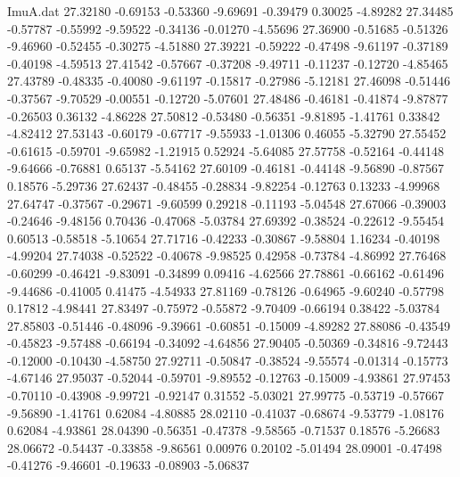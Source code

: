 \begin{filecontents}{ImuA.dat}
  27.32180   -0.69153   -0.53360   -9.69691   -0.39479    0.30025   -4.89282
  27.34485   -0.57787   -0.55992   -9.59522   -0.34136   -0.01270   -4.55696
  27.36900   -0.51685   -0.51326   -9.46960   -0.52455   -0.30275   -4.51880
  27.39221   -0.59222   -0.47498   -9.61197   -0.37189   -0.40198   -4.59513
  27.41542   -0.57667   -0.37208   -9.49711   -0.11237   -0.12720   -4.85465
  27.43789   -0.48335   -0.40080   -9.61197   -0.15817   -0.27986   -5.12181
  27.46098   -0.51446   -0.37567   -9.70529   -0.00551   -0.12720   -5.07601
  27.48486   -0.46181   -0.41874   -9.87877   -0.26503    0.36132   -4.86228
  27.50812   -0.53480   -0.56351   -9.81895   -1.41761    0.33842   -4.82412
  27.53143   -0.60179   -0.67717   -9.55933   -1.01306    0.46055   -5.32790
  27.55452   -0.61615   -0.59701   -9.65982   -1.21915    0.52924   -5.64085
  27.57758   -0.52164   -0.44148   -9.64666   -0.76881    0.65137   -5.54162
  27.60109   -0.46181   -0.44148   -9.56890   -0.87567    0.18576   -5.29736
  27.62437   -0.48455   -0.28834   -9.82254   -0.12763    0.13233   -4.99968
  27.64747   -0.37567   -0.29671   -9.60599    0.29218   -0.11193   -5.04548
  27.67066   -0.39003   -0.24646   -9.48156    0.70436   -0.47068   -5.03784
  27.69392   -0.38524   -0.22612   -9.55454    0.60513   -0.58518   -5.10654
  27.71716   -0.42233   -0.30867   -9.58804    1.16234   -0.40198   -4.99204
  27.74038   -0.52522   -0.40678   -9.98525    0.42958   -0.73784   -4.86992
  27.76468   -0.60299   -0.46421   -9.83091   -0.34899    0.09416   -4.62566
  27.78861   -0.66162   -0.61496   -9.44686   -0.41005    0.41475   -4.54933
  27.81169   -0.78126   -0.64965   -9.60240   -0.57798    0.17812   -4.98441
  27.83497   -0.75972   -0.55872   -9.70409   -0.66194    0.38422   -5.03784
  27.85803   -0.51446   -0.48096   -9.39661   -0.60851   -0.15009   -4.89282
  27.88086   -0.43549   -0.45823   -9.57488   -0.66194   -0.34092   -4.64856
  27.90405   -0.50369   -0.34816   -9.72443   -0.12000   -0.10430   -4.58750
  27.92711   -0.50847   -0.38524   -9.55574   -0.01314   -0.15773   -4.67146
  27.95037   -0.52044   -0.59701   -9.89552   -0.12763   -0.15009   -4.93861
  27.97453   -0.70110   -0.43908   -9.99721   -0.92147    0.31552   -5.03021
  27.99775   -0.53719   -0.57667   -9.56890   -1.41761    0.62084   -4.80885
  28.02110   -0.41037   -0.68674   -9.53779   -1.08176    0.62084   -4.93861
  28.04390   -0.56351   -0.47378   -9.58565   -0.71537    0.18576   -5.26683
  28.06672   -0.54437   -0.33858   -9.86561    0.00976    0.20102   -5.01494
  28.09001   -0.47498   -0.41276   -9.46601   -0.19633   -0.08903   -5.06837

\end{filecontents}
